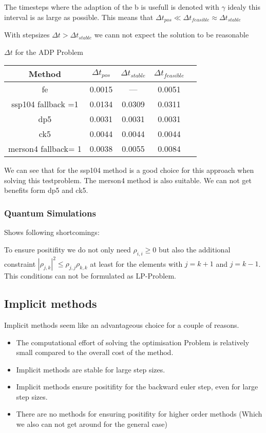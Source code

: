 \documentclass{article}
\begin{document}
The timesteps where the adaption of the b is usefull is denoted with $\gamma$ idealy this interval is as large as possible. This means that $\Delta t_{pos} \ll \Delta t_{feasible} \approx \Delta t_{stable}$

With stepsizes $\Delta t > \Delta t_{stable} $ we cann not expect the solution to be reasonable

$\Delta t$ for the ADP Problem 

\begin{tabular}{|c|c|c|c|c|}
\hline 
Method & $\Delta t_{pos}$ &$\Delta t_{stable}$& $\Delta t_{feasible}$  \\ 
\hline
fe & 0.0015 & --- &  0.0051 \\
\hline 
ssp104 fallback =1 & 0.0134 & 0.0309 & 0.0311 \\ 
\hline 
dp5 &0.0031 &0.0031 & 0.0031\\ 
\hline 
ck5 & 0.0044&  0.0044 & 0.0044\\ 
\hline 
merson4 fallback= 1& 0.0038& 0.0055 & 0.0084\\
\hline
\end{tabular} 

We can see that for the ssp104 method is a good choice for this approach when solving this testproblem.  The merson4 method is also suitable. We can not get benefits form dp5 and ck5.


\subsubsection{Quantum Simulations}
Shows following shortcomings:

To ensure positifity we do not only need $\rho_{i,i} \geq 0$ but also the additional constraint $|\rho_{j,k}|^2 \leq \rho_{j,j} \rho_{k,k}$ at least for the elements with $j = k +1$ and $j = k-1$. This conditions can not be formulated as LP-Problem.

\subsection{Implicit methods}
Implicit methods seem like an advantageous choice for a couple of reasons.

\begin{itemize}
\item The computational effort of solving the optimisation Problem is relatively small compared to the overall cost of the method.
\item Implicit methods are stable for large step sizes.
\item Implicit methods ensure positifity for the backward euler step, even for large step sizes.
\item There are no methods for ensuring positifity for higher order methods (Which we also can not get around for the general case)
\end{itemize}
\end{document}
